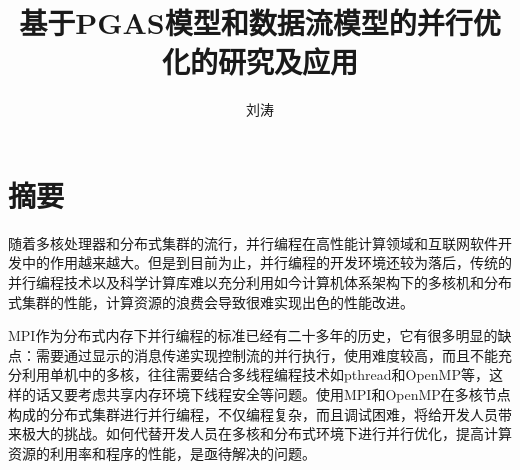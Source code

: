 \confidential{}%
\title{基于PGAS模型和数据流模型的并行优化的研究及应用}%
\author{刘涛}%
\maketitle
\makeenglishtitle
\makedeclaration
\chapter*{摘\quad 要}
\setcounter{page}{1}%

随着多核处理器和分布式集群的流行，并行编程在高性能计算领域和互联网软件开发中的作用越来越大。但是到目前为止，并行编程的开发环境还较为落后，传统的并行编程技术以及科学计算库难以充分利用如今计算机体系架构下的多核机和分布式集群的性能，计算资源的浪费会导致很难实现出色的性能改进。

MPI作为分布式内存下并行编程的标准已经有二十多年的历史，它有很多明显的缺点：需要通过显示的消息传递实现控制流的并行执行，使用难度较高，而且不能充分利用单机中的多核，往往需要结合多线程编程技术如pthread和OpenMP等，这样的话又要考虑共享内存环境下线程安全等问题。使用MPI和OpenMP在多核节点构成的分布式集群进行并行编程，不仅编程复杂，而且调试困难，将给开发人员带来极大的挑战。如何代替开发人员在多核和分布式环境下进行并行优化，提高计算资源的利用率和程序的性能，是亟待解决的问题。

